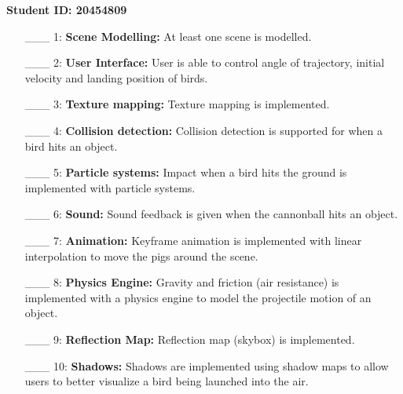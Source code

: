 \documentclass {article}
\begin{document}
{\bf Student ID: 20454809}

\begin{enumerate}
	 \item[\_\_\_ 1:]  {\bf Scene Modelling:} At least one scene is modelled.
	 
     \item[\_\_\_ 2:]  {\bf User Interface:} User is able to control angle of trajectory, initial velocity and landing position of birds.

     \item[\_\_\_ 3:]  {\bf Texture mapping:} Texture mapping is implemented.

     \item[\_\_\_ 4:]  {\bf Collision detection:} Collision detection is supported for when a bird hits an object.
     
     \item[\_\_\_ 5:]  {\bf Particle systems:} Impact when a bird hits the ground is implemented with particle systems.

     \item[\_\_\_ 6:]  {\bf Sound:} Sound feedback is given when the cannonball hits an object.

     \item[\_\_\_ 7:]  {\bf Animation:} Keyframe animation is implemented with linear interpolation to move the pigs around the scene.

     \item[\_\_\_ 8:]  {\bf Physics Engine:} Gravity and friction (air resistance) is implemented with a physics engine to model the projectile motion of an object.

     \item[\_\_\_ 9:]  {\bf Reflection Map:} Reflection map (skybox) is implemented.

     \item[\_\_\_ 10:]  {\bf Shadows:} Shadows are implemented using shadow maps
 to allow users to better visualize a bird being launched into the air.
\end{enumerate}
\end{document}
